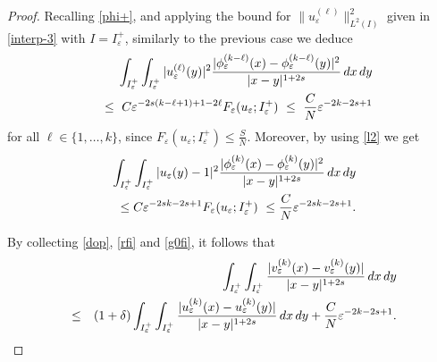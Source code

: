\documentclass{article}
\newcommand{\e}{\varepsilon}
\begin{document}
\begin{proof}
Recalling \eqref{phi+}, and applying the bound for $\|u_\e^{(\ell)}\|^2_{L^2(I)}$ given in \eqref{interp-3} with $I=I_\e^+$, similarly to the previous case we deduce  
\begin{eqnarray}\label{rfi}
&&\hspace{-2cm}\int_{I_\e^+}\int_{I_\e^+} |u_\e^{(\ell)}(y)|^2\frac{|\phi_\e^{(k-\ell)}(x)-\phi_\e^{(k-\ell)}(y)|^2}{|x-y|^{1+2s}}\, dx\, dy
\nonumber\\
&&\leq\ C\e^{-2s(k-\ell+1)+1-2\ell}F_\e(u_\e;I_\e^+)\ 
\leq\ \frac{C}{N}\e^{-2k-2s+1}%
\end{eqnarray}
for all $\ell\in\{1,\dots, k\}$, since $F_\e(u_\e;I_\e^+)\leq \frac{S}{N}$. 
Moreover, by using \eqref{l2} we get  
\begin{eqnarray}\label{g0fi}
&&\hspace{-2cm}\int_{I_\e^+}\int_{I_\e^+} |u_\e(y)-1|^2\frac{|\phi_\e^{(k)}(x)-\phi_\e^{(k)}(y)|^2}{|x-y|^{1+2s}}\, dx\, dy
\nonumber\\
&&\leq C
\e^{-2sk-2s+1}F_\e(u_\e;I_\e^+)\ \leq \frac{C}{N} 
\e^{-2sk-2s+1}.
\end{eqnarray} 


By collecting \eqref{dop}, \eqref{rfi} and \eqref{g0fi}, it follows that 
\begin{eqnarray}\label{pp}
&&\hspace{-1cm}\int_{I_\e^+}\int_{I_\e^+}\frac{|v^{(k)}_\e(x)-v^{(k)}_\e(y)|}{|x-y|^{1+2s}}\, dx\, dy\nonumber\\
&\leq&(1+\delta)\int_{I_\e^+}\int_{I_\e^+}\frac{|u^{(k)}_\e(x)-u^{(k)}_\e(y)|}{|x-y|^{1+2s}}\, dx\, dy+\frac{C}{N}\e^{-2k-2s+1}. 
\end{eqnarray}

\medskip 



\end{proof}
\end{document}
